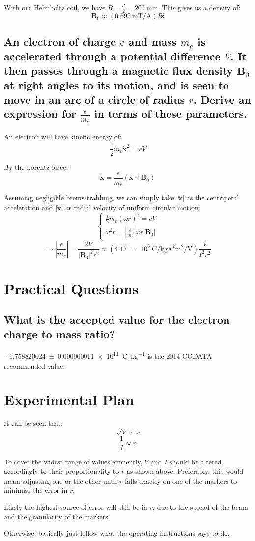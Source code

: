 \documentclass[a4paper]{scrartcl}
\begin{document}
With our Helmholtz coil, we have \(R = \frac{d}{2} = \SI{200}{\milli\metre}\). This gives us a density of:
\[\mathbf{B}_0 \approx (\SI{0.692}{\milli\tesla\per\ampere}) I \mathbf{\hat{z}}\]

\subsection{An electron of charge \(e\) and mass \(m_e\) is accelerated through a potential difference \(V\). It then passes through a magnetic flux density \(\mathbf{B}_0\) at right angles to its motion, and is seen to move in an arc of a circle of radius \(r\). Derive an expression for \(\frac{e}{m_e}\) in terms of these parameters.}
An electron will have kinetic energy of:
\[\frac{1}{2} m_e \dot{\mathbf{x}}^2 = e V\]

By the Lorentz force:
\[\ddot{\mathbf{x}} = \frac{e}{m_e} (\dot{\mathbf{x}} \times \mathbf{B}_0)\]

Assuming negligible bremsstrahlung, we can simply take \(|\ddot{\mathbf{x}}|\) as the centripetal acceleration and \(|\dot{\mathbf{x}}|\) as radial velocity of uniform circular motion:
\[\begin{cases}
    \frac{1}{2} m_e (\omega r)^2 = e V \\
    \omega^2 r = \left|\frac{e}{m_e}\right| \omega r |\mathbf{B}_0|
\end{cases}\]
\[\Longrightarrow \left|\frac{e}{m_e}\right| = \frac{2 V}{|\mathbf{B}_0|^2 r^2} \approx (\SI{4.17e6}{\coulomb\per\kilo\gram\ampere\squared\metre\squared\per\volt}) \frac{V}{I^2 r^2}\]

\section{Practical Questions}
\subsection{What is the accepted value for the electron charge to mass ratio?}
\SI{-1.758820024 \pm 0.000000011e11}{\coulomb\per\kilo\gram} is the 2014 CODATA recommended value.

\section{Experimental Plan}
It can be seen that:
\[\sqrt{V} \propto r\]
\[\frac{1}{I} \propto r\]

To cover the widest range of values efficiently, \(V\) and \(I\) should be altered accordingly to their proportionality to \(r\) as shown above. Preferably, this would mean adjusting one or the other until \(r\) falls exactly on one of the markers to minimise the error in \(r\).

Likely the highest source of error will still be in \(r\), due to the spread of the beam and the granularity of the markers.

Otherwise, basically just follow what the operating instructions says to do.
\end{document}
